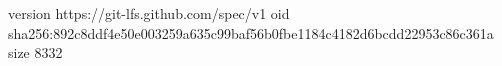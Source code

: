 version https://git-lfs.github.com/spec/v1
oid sha256:892c8ddf4e50e003259a635c99baf56b0fbe1184c4182d6bcdd22953c86c361a
size 8332
